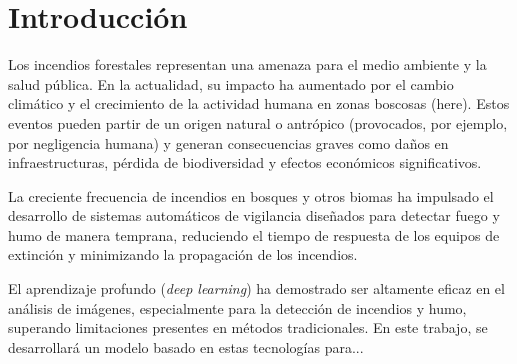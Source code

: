 \section{Introducción}
Los incendios forestales representan una amenaza para el medio ambiente y la salud pública.
En la actualidad, su impacto ha aumentado por el cambio climático y el crecimiento
de la actividad humana en zonas boscosas (here). Estos eventos pueden partir de un origen
natural o antrópico (provocados, por ejemplo, por negligencia humana) y generan
consecuencias graves como daños en infraestructuras, pérdida de biodiversidad y
efectos económicos significativos.

La creciente frecuencia de incendios en bosques y otros biomas ha impulsado el desarrollo
de sistemas automáticos de vigilancia diseñados para detectar fuego y humo de manera
temprana, reduciendo el tiempo de respuesta de los equipos de extinción y minimizando
la propagación de los incendios.

El aprendizaje profundo (\textit{deep learning}) ha demostrado ser altamente eficaz
en el análisis de imágenes, especialmente para la detección de incendios y humo,
superando limitaciones presentes en métodos tradicionales. En este trabajo,
se desarrollará un modelo basado en estas tecnologías para...